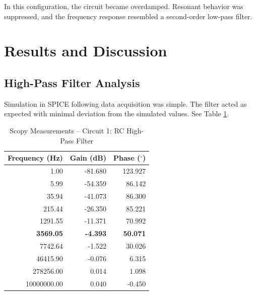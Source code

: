 \documentclass[12pt]{article}
\begin{document}
\noindent In this configuration, the circuit became overdamped. Resonant behavior was suppressed, and the frequency response resembled a second-order low-pass filter.
\section{Results and Discussion}
\subsection{High-Pass Filter Analysis}
Simulation in SPICE following data acquisition was simple. The filter acted as
expected with minimal deviation from the simulated values. See
Table \ref{tab:circuitone}.
\begin{table}[H]
	\centering
	\begin{tabular}{|r|r|r|}
		\hline
		\textbf{Frequency (Hz)} & \textbf{Gain (dB)} & \textbf{Phase ($^\circ$)} \\
		\hline
		1.00                    & -81.680            & 123.927                   \\
		5.99                    & -54.359            & 86.142                    \\
		35.94                   & -41.073            & 86.300                    \\
		215.44                  & -26.350            & 85.221                    \\
		1291.55                 & -11.371            & 70.992                    \\
		\textbf{3569.05}        & \textbf{-4.393}    & \textbf{50.071}           \\
		7742.64                 & -1.522             & 30.026                    \\
		46415.90                & -0.076             & 6.315                     \\
		278256.00               & 0.014              & 1.098                     \\
		10000000.00             & 0.040              & -0.450                    \\
		\hline
	\end{tabular}
	\caption{Scopy Measurements – Circuit 1: RC High-Pass Filter}
	\label{tab:circuitone}
\end{table}
\end{document}
